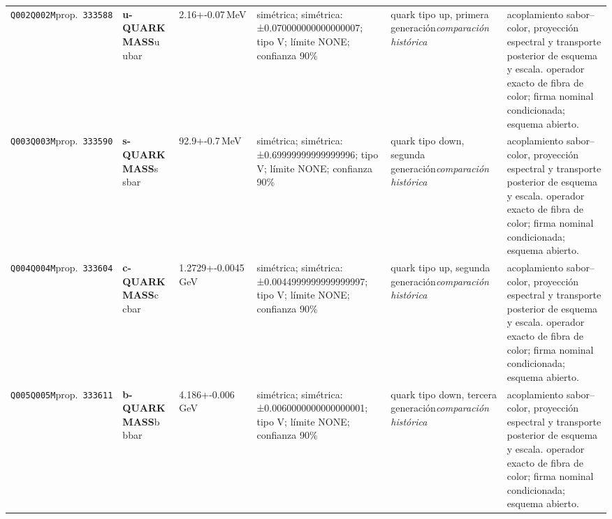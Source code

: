 \begin{landscape}
\begin{longtable}{L{1.85cm}L{4.45cm}L{2.35cm}L{4.05cm}L{3.35cm}L{7.15cm}}
\texttt{Q002}\newline \texttt{Q002M}\newline prop.\ \texttt{333588} & \textbf{u-QUARK MASS}\newline u \textbar{}\allowbreak{} ubar & 2.16+-0.07\,MeV & simétrica; simétrica: ±0.070000000000000007; tipo V; límite NONE; confianza 90\% & quark tipo up, primera generación\newline \emph{comparación histórica} & acoplamiento sabor--color, proyección espectral y transporte posterior de esquema y escala. operador exacto de fibra de color; firma nominal condicionada; esquema abierto. \\
\texttt{Q003}\newline \texttt{Q003M}\newline prop.\ \texttt{333590} & \textbf{s-QUARK MASS}\newline s \textbar{}\allowbreak{} sbar & 92.9+-0.7\,MeV & simétrica; simétrica: ±0.69999999999999996; tipo V; límite NONE; confianza 90\% & quark tipo down, segunda generación\newline \emph{comparación histórica} & acoplamiento sabor--color, proyección espectral y transporte posterior de esquema y escala. operador exacto de fibra de color; firma nominal condicionada; esquema abierto. \\
\texttt{Q004}\newline \texttt{Q004M}\newline prop.\ \texttt{333604} & \textbf{c-QUARK MASS}\newline c \textbar{}\allowbreak{} cbar & 1.2729+-0.0045\,GeV & simétrica; simétrica: ±0.0044999999999999997; tipo V; límite NONE; confianza 90\% & quark tipo up, segunda generación\newline \emph{comparación histórica} & acoplamiento sabor--color, proyección espectral y transporte posterior de esquema y escala. operador exacto de fibra de color; firma nominal condicionada; esquema abierto. \\
\texttt{Q005}\newline \texttt{Q005M}\newline prop.\ \texttt{333611} & \textbf{b-QUARK MASS}\newline b \textbar{}\allowbreak{} bbar & 4.186+-0.006\,GeV & simétrica; simétrica: ±0.0060000000000000001; tipo V; límite NONE; confianza 90\% & quark tipo down, tercera generación\newline \emph{comparación histórica} & acoplamiento sabor--color, proyección espectral y transporte posterior de esquema y escala. operador exacto de fibra de color; firma nominal condicionada; esquema abierto. \\

\end{longtable}
\end{landscape}
